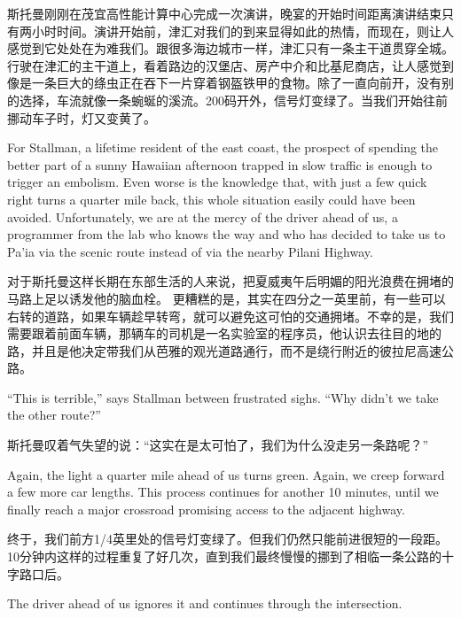 \ifdefined\chs
斯托曼刚刚在茂宜高性能计算中心完成一次演讲，晚宴的开始时间距离演讲结束只有两小时时间。演讲开始前，津汇对我们的到来显得如此的热情，而现在，则让人感觉到它处处在为难我们。跟很多海边城市一样，津汇只有一条主干道贯穿全城。行驶在津汇的主干道上，看着路边的汉堡店、房产中介和比基尼商店，让人感觉到像是一条巨大的绦虫正在吞下一片穿着钢盔铁甲的食物。除了一直向前开，没有别的选择，车流就像一条蜿蜒的溪流。200码开外，信号灯变绿了。当我们开始往前挪动车子时，灯又变黄了。
\fi

\ifdefined\eng
For Stallman, a lifetime resident of the east coast, the prospect of spending the better part of a sunny Hawaiian afternoon trapped in slow traffic is enough to trigger an embolism. %
Even worse is the knowledge that, with just a few quick right turns a quarter mile back, this whole situation easily could have been avoided. Unfortunately, we are at the mercy of the driver ahead of us, a programmer from the lab who knows the way and who has decided to take us to Pa'ia via the scenic route instead of via the nearby Pilani Highway.
\fi

\ifdefined\chs
对于斯托曼这样长期在东部生活的人来说，把夏威夷午后明媚的阳光浪费在拥堵的马路上足以诱发他的脑血栓。%
更糟糕的是，其实在四分之一英里前，有一些可以右转的道路，如果车辆趁早转弯，就可以避免这可怕的交通拥堵。不幸的是，我们需要跟着前面车辆，那辆车的司机是一名实验室的程序员，他认识去往目的地的路，并且是他决定带我们从芭雅的观光道路通行，而不是绕行附近的彼拉尼高速公路。
\fi

\ifdefined\eng
``This is terrible,'' says Stallman between frustrated sighs. ``Why didn't we take the other route?''
\fi

\ifdefined\chs
斯托曼叹着气失望的说：``这实在是太可怕了，我们为什么没走另一条路呢？''
\fi

\ifdefined\eng
Again, the light a quarter mile ahead of us turns green. Again, we creep forward a few more car lengths. This process continues for another 10 minutes, until we finally reach a major crossroad promising access to the adjacent highway.
\fi

\ifdefined\chs
终于，我们前方1/4英里处的信号灯变绿了。但我们仍然只能前进很短的一段距。10分钟内这样的过程重复了好几次，直到我们最终慢慢的挪到了相临一条公路的十字路口后。
\fi

\ifdefined\eng
The driver ahead of us ignores it and continues through the intersection.
\fi

